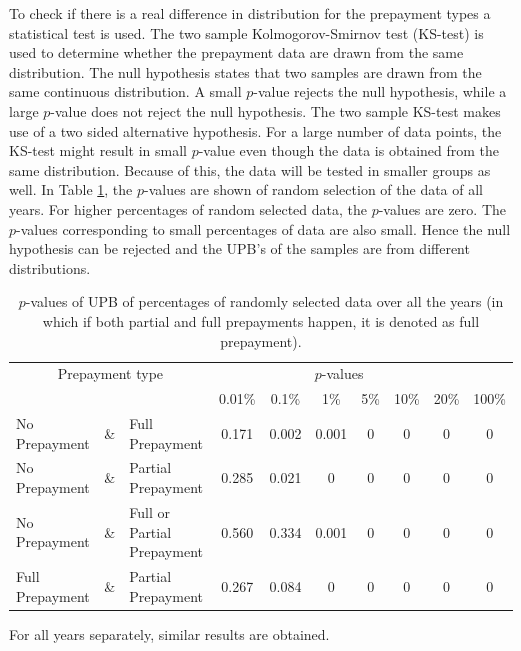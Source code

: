         \noindent
        To check if there is a real difference in distribution for
        the prepayment types a statistical test is used. 
        The two sample Kolmogorov-Smirnov test (KS-test) is used to
        determine whether the prepayment data are drawn from the same
        distribution. The null hypothesis states that two samples
        are drawn from the same continuous distribution. A small
        $p$-value rejects the null hypothesis, while a large
        $p$-value does not reject the null hypothesis. The two
        sample KS-test makes use of a two sided alternative
        hypothesis. For a large number of data points, the KS-test
        might result in small $p$-value even though the data is
        obtained from the same distribution. Because of this, the
        data will be tested in smaller groups as well. 
        In Table \ref{model_Pvals_of_UPB}, the $p$-values are shown
        of random selection of the data of all years. For higher
        percentages of random selected data, the $p$-values are
        zero. The $p$-values corresponding to small percentages of
        data are also small. Hence the null hypothesis can be
        rejected and the UPB's of the samples are from
        different distributions. 
        \begin{table}[H]
        \centering
            \begin{tabular}{lcl|c|c|c|c|c|c|c}
                \multicolumn{3}{c|}{Prepayment type} 
                & \multicolumn{6}{c}{$p$-values}& \\
                &&&0.01\%&0.1\%&1\%&5\%&10\%&20\%&100\%\\\hline
                No Prepayment & \& & Full Prepayment & 0.171 & 0.002&0.001&0&0&0&0\\
                No Prepayment & \& & Partial Prepayment & 0.285 & 0.021&0&0&0&0&0\\
                No Prepayment & \& & Full or Partial Prepayment & 0.560 & 0.334&0.001&0&0&0&0 \\
                Full Prepayment & \& & Partial Prepayment & 0.267 & 0.084&0&0&0&0&0
		    \end{tabular}
            \caption{
                $p$-values of UPB of percentages of randomly selected data over all the years (in which if both partial and full 
                prepayments happen, it is denoted as full prepayment).
                }
	        \label{model_Pvals_of_UPB}
        \end{table}
        \noindent
        For all years separately, similar results are obtained.

